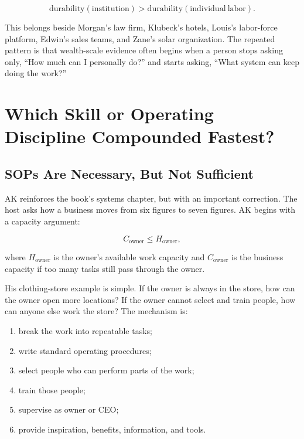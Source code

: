 \documentclass[11pt,oneside]{book}
\begin{document}
\begin{equation}
\mathrm{durability}(\mathrm{institution})
>
\mathrm{durability}(\mathrm{individual\ labor}).
\end{equation}

This belongs beside Morgan's law firm, Klubeck's hotels, Louis's labor-force platform, Edwin's sales teams, and Zane's solar organization. The repeated pattern is that wealth-scale evidence often begins when a person stops asking only, ``How much can I personally do?'' and starts asking, ``What system can keep doing the work?''

\chapter{Which Skill or Operating Discipline Compounded Fastest?}

\section{SOPs Are Necessary, But Not Sufficient}

AK reinforces the book's systems chapter, but with an important correction. The host asks how a business moves from six figures to seven figures. AK begins with a capacity argument:

\begin{equation}
C_{\mathrm{owner}} \leq H_{\mathrm{owner}},
\end{equation}

where \(H_{\mathrm{owner}}\) is the owner's available work capacity and \(C_{\mathrm{owner}}\) is the business capacity if too many tasks still pass through the owner.

His clothing-store example is simple. If the owner is always in the store, how can the owner open more locations? If the owner cannot select and train people, how can anyone else work the store? The mechanism is:

\begin{enumerate}
\item break the work into repeatable tasks;
\item write standard operating procedures;
\item select people who can perform parts of the work;
\item train those people;
\item supervise as owner or CEO;
\item provide inspiration, benefits, information, and tools.
\end{enumerate}
\end{document}
